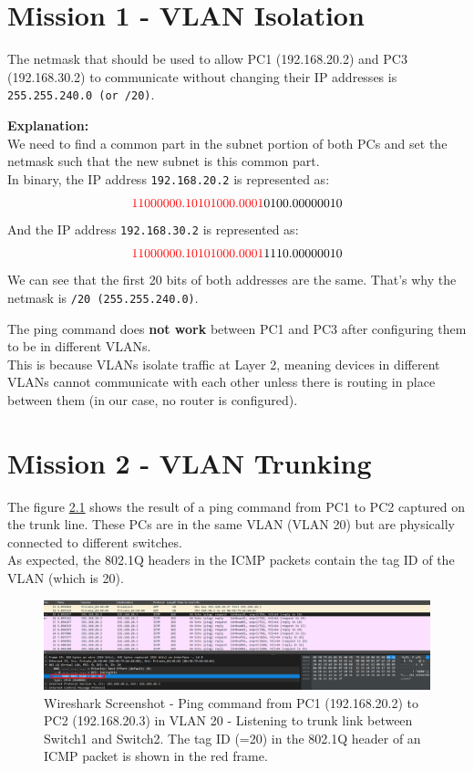 \documentclass[10pt,a4paper]{ULBreport}
\begin{document}
\chapter{Mission 1 - VLAN Isolation}



The netmask that should be used to allow PC1 (192.168.20.2) and PC3 (192.168.30.2) to communicate without changing their IP addresses is \texttt{255.255.240.0 (or /20)}.
    
\textbf{Explanation:}\\
We need to find a common part in the subnet portion of both PCs and set the netmask such that the new subnet is this common part.\\
In binary, the IP address \texttt{192.168.20.2} is represented as:
\[
\textcolor{red}{11000000.10101000.0001}0100.00000010
\]
And the IP address \texttt{192.168.30.2} is represented as:
\[
\textcolor{red}{11000000.10101000.0001}1110.00000010
\]
We can see that the first 20 bits of both addresses are the same. That's why the netmask is \texttt{/20 (255.255.240.0)}.




The ping command does \textbf{not work} between PC1 and PC3 after configuring them to be in different VLANs. \\
This is because VLANs isolate traffic at Layer 2, meaning devices in different VLANs cannot communicate with each other unless there is routing in place between them (in our case, no router is configured).



\chapter{Mission 2 - VLAN Trunking}




The figure \ref{trunkICMP} shows the result of a ping command from PC1 to PC2 captured on the trunk line. These PCs are in the same VLAN (VLAN 20) but are physically connected to different switches. \\
As expected, the 802.1Q headers in the ICMP packets contain the tag ID of the VLAN (which is 20).

\begin{figure}[H]
    \centering
    \includegraphics[width=\textwidth]{Images/trunkHeader.png}
    \caption{Wireshark Screenshot - Ping command from PC1 (192.168.20.2) to PC2 (192.168.20.3) in VLAN 20 - Listening to trunk link between Switch1 and Switch2. The tag ID (=20) in the 802.1Q header of an ICMP packet is shown in the red frame.}
    \label{trunkICMP}
\end{figure}
\end{document}
